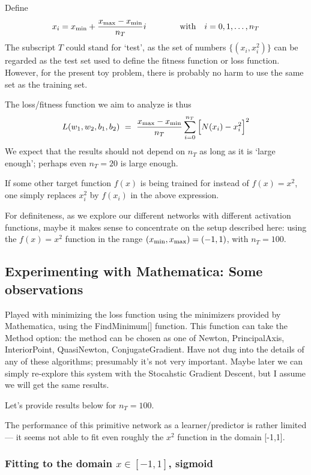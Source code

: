 \documentclass[12pt,a4paper]{article}
\begin{document}
Define
\[
x_i = x_{\rm min} + \frac{x_{\rm max} - x_{\rm min}}{n_T} i
\qquad \qquad  \text{with} \quad i = 0, 1,\ldots, n_T
\]
The subscript $T$ could stand for `test', as the set of numbers $\{(x_i,x_i^2)\}$ can be regarded as
the test set used to define the fitness function or loss function.  However, for the present
toy problem, there is probably no harm to use the same set as the training set.

The loss/fitness function we aim to analyze is thus 
\begin{equation}
L(w_1,w_2,b_1,b_2) ~=~  \frac{x_{\rm max} - x_{\rm min}}{n_T} \sum_{i=0}^{n_T} \Big[ N(x_i) -x_i^2 \Big]^2 
\end{equation}
%
We expect that the results should not depend on $n_T$ as long as it is `large enough'; perhaps
even $n_T=20$ is large enough. 

If some other target function $f(x)$ is being trained for instead of $f(x)=x^2$, one simply replaces
$x_i^2$ by $f(x_i)$ in the above expression.  

For definiteness, as we explore our different networks with different activation functions, maybe it
makes sense to concentrate on the setup described here: using the $f(x)=x^2$ function in the range
$(x_{\rm min},x_{\rm max}) = (-1,1)$, with $n_T=100$.  


\subsection{Experimenting with Mathematica: Some observations}

Played with minimizing the loss function using the minimizers provided by Mathematica, using the 
FindMinimum[] function.  This function can take the Method option: the method can be chosen as one
of Newton, PrincipalAxis, InteriorPoint, QuasiNewton, ConjugateGradient.  Have not dug into the
details of any of these algorithms; presumably it's not very important.  Maybe later we can simply
re-explore this system with the Stocahstic Gradient Descent, but I assume we will get the same
results.  

Let's provide results below for $n_T=100$.  

The performance of this primitive network as a learner/predictor is rather limited --- it seems not
able to fit even roughly the $x^2$ function in the domain [-1,1].  


\subsubsection{Fitting to the domain $x\in[-1,1]$, sigmoid}
\end{document}
